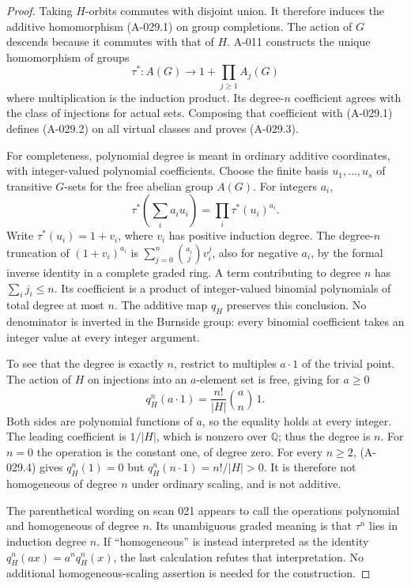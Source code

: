 \begin{proof}
Taking \(H\)-orbits commutes with disjoint union. It therefore
induces the additive homomorphism (A-029.1) on group completions.
The action of \(G\) descends because it commutes with that of \(H\).
A-011 constructs the unique homomorphism of groups
\[
 \tau^*:A(G)\longrightarrow
        1+\prod_{j\geq1}A_j(G)
\]
where multiplication is the induction product. Its degree-\(n\)
coefficient agrees with the class of injections for actual sets.
Composing that coefficient with (A-029.1) defines (A-029.2) on
all virtual classes and proves (A-029.3).

For completeness, polynomial degree is meant in ordinary additive
coordinates, with integer-valued polynomial coefficients. Choose
the finite basis \(u_1,\ldots,u_s\) of transitive \(G\)-sets
for the free abelian group \(A(G)\). For integers \(a_i\),
\[
             \tau^*\left(\sum_i a_i u_i\right)
                         =\prod_i\tau^*(u_i)^{a_i}.
\]
Write \(\tau^*(u_i)=1+v_i\), where \(v_i\) has positive
induction degree. The degree-\(n\) truncation of
\((1+v_i)^{a_i}\) is
\(\sum_{j=0}^n\binom{a_i}{j}v_i^j\), also for negative
\(a_i\), by the formal inverse identity in a complete graded ring.
A term contributing to degree \(n\) has \(\sum_i j_i\leq n\).
Its coefficient is a product of integer-valued binomial polynomials
of total degree at most \(n\). The additive map \(q_H\)
preserves this conclusion. No denominator is inverted in the
Burnside group: every binomial coefficient takes an integer value
at every integer argument.

To see that the degree is exactly \(n\), restrict to multiples
\(a\cdot1\) of the trivial point. The action of \(H\) on
injections into an \(a\)-element set is free, giving for
\(a\geq0\)
\[
 q_H^n(a\cdot1)=\frac{n!}{|H|}\binom an\,1.                    \tag{A-029.4}
\]
Both sides are polynomial functions of \(a\), so the equality
holds at every integer. The leading coefficient is \(1/|H|\),
which is nonzero over \(\mathbb Q\); thus the degree is \(n\).
For \(n=0\) the operation is the constant one, of degree zero.
For every \(n\geq2\), (A-029.4) gives \(q_H^n(1)=0\) but
\(q_H^n(n\cdot1)=n!/|H|>0\). It is therefore not homogeneous
of degree \(n\) under ordinary scaling, and is not additive.

The parenthetical wording on scan 021 appears to call the
operations polynomial and homogeneous of degree \(n\). Its
unambiguous graded meaning is that \(\tau^n\) lies in induction
degree \(n\). If ``homogeneous'' is instead interpreted as the
identity \(q_H^n(ax)=a^nq_H^n(x)\), the last calculation refutes
that interpretation. No additional homogeneous-scaling assertion
is needed for the construction.
\end{proof}

